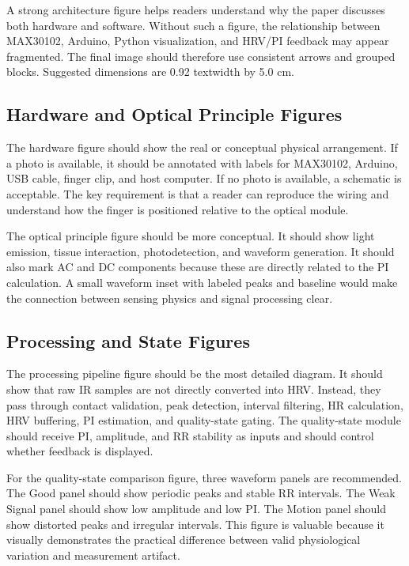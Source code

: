 \documentclass[10pt,conference]{IEEEtran}
\begin{document}
A strong architecture figure helps readers understand why the paper discusses both hardware and software. Without such a figure, the relationship between MAX30102, Arduino, Python visualization, and HRV/PI feedback may appear fragmented. The final image should therefore use consistent arrows and grouped blocks. Suggested dimensions are 0.92 textwidth by 5.0 cm.

\subsection{Hardware and Optical Principle Figures}
The hardware figure should show the real or conceptual physical arrangement. If a photo is available, it should be annotated with labels for MAX30102, Arduino, USB cable, finger clip, and host computer. If no photo is available, a schematic is acceptable. The key requirement is that a reader can reproduce the wiring and understand how the finger is positioned relative to the optical module.

The optical principle figure should be more conceptual. It should show light emission, tissue interaction, photodetection, and waveform generation. It should also mark AC and DC components because these are directly related to the PI calculation. A small waveform inset with labeled peaks and baseline would make the connection between sensing physics and signal processing clear.

\subsection{Processing and State Figures}
The processing pipeline figure should be the most detailed diagram. It should show that raw IR samples are not directly converted into HRV. Instead, they pass through contact validation, peak detection, interval filtering, HR calculation, HRV buffering, PI estimation, and quality-state gating. The quality-state module should receive PI, amplitude, and RR stability as inputs and should control whether feedback is displayed.

For the quality-state comparison figure, three waveform panels are recommended. The Good panel should show periodic peaks and stable RR intervals. The Weak Signal panel should show low amplitude and low PI. The Motion panel should show distorted peaks and irregular intervals. This figure is valuable because it visually demonstrates the practical difference between valid physiological variation and measurement artifact.
\end{document}
